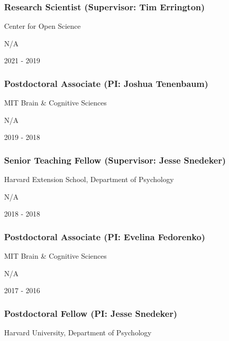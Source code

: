 \documentclass[
]{article}
\begin{document}
\hypertarget{research-scientist-supervisor-tim-errington}{%
\subsubsection{Research Scientist (Supervisor: Tim
Errington)}\label{research-scientist-supervisor-tim-errington}}

Center for Open Science

N/A

2021 - 2019

\hypertarget{postdoctoral-associate-pi-joshua-tenenbaum}{%
\subsubsection{Postdoctoral Associate (PI: Joshua
Tenenbaum)}\label{postdoctoral-associate-pi-joshua-tenenbaum}}

MIT Brain \& Cognitive Sciences

N/A

2019 - 2018

\hypertarget{senior-teaching-fellow-supervisor-jesse-snedeker}{%
\subsubsection{Senior Teaching Fellow (Supervisor: Jesse
Snedeker)}\label{senior-teaching-fellow-supervisor-jesse-snedeker}}

Harvard Extension School, Department of Psychology

N/A

2018 - 2018

\hypertarget{postdoctoral-associate-pi-evelina-fedorenko}{%
\subsubsection{Postdoctoral Associate (PI: Evelina
Fedorenko)}\label{postdoctoral-associate-pi-evelina-fedorenko}}

MIT Brain \& Cognitive Sciences

N/A

2017 - 2016

\hypertarget{postdoctoral-fellow-pi-jesse-snedeker}{%
\subsubsection{Postdoctoral Fellow (PI: Jesse
Snedeker)}\label{postdoctoral-fellow-pi-jesse-snedeker}}

Harvard University, Department of Psychology
\end{document}
